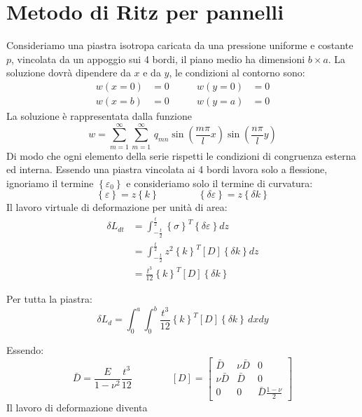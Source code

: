 \section{Metodo di Ritz per pannelli}

Consideriamo una piastra isotropa caricata da una pressione uniforme e costante $p$, vincolata da un appoggio sui 4 bordi, il piano medio ha dimensioni $b\times a$. La soluzione dovrà dipendere da $x$ e da $y$, le condizioni al contorno sono:
\begin{align*}
    w(x=0)&=0\qquad &w(y=0)&=0\\
    w(x=b)&=0\qquad &w(y=a)&=0
\end{align*}
La soluzione è rappresentata dalla funzione
\begin{equation*}
    w= \sum^\infty_{m=1}  \sum^\infty_{m=1}\,q_{mn}\sin{\left(\frac{m\pi}{l}x\right)}  \sin{\left(\frac{n\pi}{l}y\right)}
\end{equation*}
Di modo che ogni elemento della serie rispetti le condizioni di congruenza esterna ed interna.
Essendo una piastra vincolata ai 4 bordi lavora solo a flessione, ignoriamo il termine $\left\{\varepsilon_0 \right\}$ e consideriamo solo il termine di curvatura:
\begin{equation*}
    \left\{\varepsilon \right\}=z\left\{k \right\}\qquad\qquad    \left\{\delta\varepsilon \right\}=z\left\{\delta k \right\}
\end{equation*}
Il lavoro virtuale di deformazione per unità di area:
\begin{align*}
 \delta L_{dt}  &= \int_{-\frac{t}{2}}^{\frac{t}{2}}      \left\{\sigma\right\}^T   \left\{\delta\varepsilon\right\}dz\\
   &= \int_{-\frac{t}{2}}^{\frac{t}{2}}    z^2  \left\{k\right\}^T   [D]\left\{\delta k\right\}dz\\
   &= \frac{t^3}{12} \left\{k\right\}^T   [D]\left\{\delta k\right\}
\end{align*}

Per tutta la piastra:
\begin{equation*}
    \delta L_d=\int_0^a\int_0^b \frac{t^3}{12} \left\{k\right\}^T   [D]\left\{\delta k\right\}\,dx dy
\end{equation*}

Essendo:
\begin{equation*}
    \bar{D}=\frac{E}{1-\nu^2}\frac{t^3}{12} \qquad\qquad
[D]=\left[
\begin{array}{ccc}
\displaystyle \bar{D} & \displaystyle \nu\bar{D} & \displaystyle 0\\
\displaystyle \nu\bar{D} & \displaystyle \bar{D} & \displaystyle 0 \\
\displaystyle 0& \displaystyle 0 & \displaystyle \bar{D}\frac{1-\nu}{2}
\end{array}
\right]    
\end{equation*}
Il lavoro di deformazione diventa



